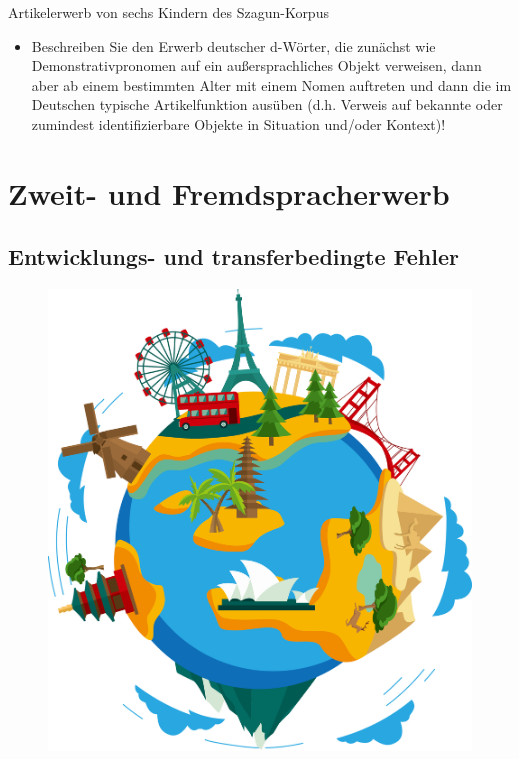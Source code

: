 \documentclass[
  letterpaper,
]{scrbook}
\providecommand{\tightlist}{%
  \setlength{\itemsep}{0pt}\setlength{\parskip}{0pt}}\usepackage{longtable,booktabs,array}
\begin{document}
Artikelerwerb von sechs Kindern des Szagun-Korpus

\begin{itemize}
\tightlist
\item
  Beschreiben Sie den Erwerb deutscher d-Wörter, die zunächst wie
  Demonstrativpronomen auf ein außersprachliches Objekt verweisen, dann
  aber ab einem bestimmten Alter mit einem Nomen auftreten und dann die
  im Deutschen typische Artikelfunktion ausüben (d.h. Verweis auf
  bekannte oder zumindest identifizierbare Objekte in Situation und/oder
  Kontext)!
\end{itemize}

\part{Zweit- und Fremdspracherwerb}

\hypertarget{sec-gender}{%
\chapter{Entwicklungs- und transferbedingte Fehler}\label{sec-gender}}

\begin{figure}

{\centering 

\href{https://www.clipartmax.com/middle/m2i8K9H7K9H7G6b1_earth-clip-art-world-travel-clipart-png/}{\includegraphics[width=1\textwidth,height=\textheight]{./pictures/clipart66213.png}}

}

\end{figure}
\end{document}
